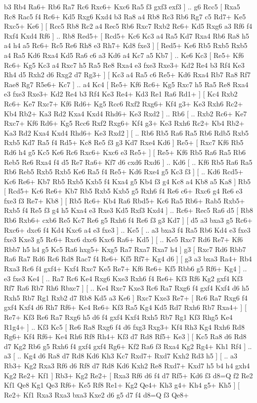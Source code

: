 b3 Rb4  Ra6+ Rb6  Ra7 Rc6  Rxc6+ Kxc6  Ra5 f3  gxf3 exf3   ] .. g6    Rcc5 [  Rxa5 Rc8  Rac5 f4  Rc6+ Kd5  Rxg6 Kxd4  b3 Ra8  a4 Rb8  Rc3 Rb6  Rg7 c5  Rd7+ Ke5  Rxc5+ Ke6   ]  [  Rcc5 Rb8  Rc2 a4  Rec5 Rb6  Rxc7 Rxb2  Rc6+ Kd5  Rxg6 a3  Rf6 f4  Rxf4 Kxd4  Rf6   ] .. Rb8    Red5+ [  Rcd5+ Kc6  Kc3 a4  Ra5 Kd7  Rxa4 Rb6  Ra8 h5  a4 h4  a5 Rc6+  Rc5 Re6  Rh8 e3  Rh7+ Kd8  fxe3   ]  [  Red5+ Ke6  Rb5 Rxb5  Rxb5 a4  Ra5 Kd6  Rxa4 Kd5  Ra6 c6  a3 Kd6  a4 Kc7  a5 Kb7   ] .. Ke6    Kc3 [  Re5+ Kf6  Rc6+ Kg5  Kc3 a4  Rxc7 h5  Ra5 Re8  Rxa4 e3  fxe3 Rxe3+  Kd2 Re4  b3 Rf4  Ke3 Rh4  d5 Rxh2  d6 Rxg2  d7 Rg3+   ]  [  Kc3 a4  Ra5 c6  Re5+ Kd6  Rxa4 Rb7  Ra8 Rf7  Rae8 Rg7  R5e6+ Kc7   ] .. a4    Kc4 [  Re5+ Kf6  Rc6+ Kg5  Rxc7 h5  Ra5 Re8  Rxa4 e3  fxe3 Rxe3+  Kd2 Re4  b3 Rf4  Ke3 Re4+  Kd3 Re1  Ra6 Rd1+   ]  [  Kc4 Rxb2  Rc6+ Ke7  Rxc7+ Kf6  Rd6+ Kg5  Rcc6 Rxf2  Rxg6+ Kf4  g3+ Ke3  Rxh6 Rc2+  Kb4 Rb2+  Ka3 Rd2  Kxa4 Kxd4  Rhd6+ Ke3  Rxd2   ] .. Rb6 [ .. Rxb2  Rc6+ Ke7  Rxc7+ Kf6  Rd6+ Kg5  Rcc6 Rxf2  Rxg6+ Kf4  g3+ Ke3  Rxh6 Rc2+  Kb4 Rb2+  Ka3 Rd2  Kxa4 Kxd4  Rhd6+ Ke3  Rxd2   ]  [ .. Rb6  Rb5 Ra6  Ra5 Rb6  Rdb5 Rxb5  Rxb5 Kd7  Ra5 f4  Rd5+ Kc8  Re5 f3  g3 Kd7  Rxe4 Kd6   ]  Re5+ [  Rxc7 Kf6  Rb5 Rd6  h4 g5  Kc5 Ke6  Rc6 Rxc6+  Kxc6 e3  Re5+   ]  [  Re5+ Kf6  Rb5 Ra6  Ra5 Rb6  Reb5 Re6  Rxa4 f4  d5 Re7  Ra6+ Kf7  d6 cxd6  Rxd6   ] .. Kd6 [ .. Kf6  Rb5 Ra6  Ra5 Rb6  Reb5 Rxb5  Rxb5 Ke6  Ra5 f4  Re5+ Kd6  Rxe4 g5  Kc3 f3   ]  [ .. Kd6  Rcd5+ Kc6  Re6+ Kb7  Rb5 Rxb5  Kxb5 f4  Kxa4 g5  Kb4 f3  g4 Kc8  a4 Kb8  a5 Ka8   ]  Rb5 [  Rcd5+ Kc6  Re6+ Kb7  Rb5 Rxb5  Kxb5 g5  Rxh6 f4  Re6 c6+  Rxc6 g4  Re6 e3  fxe3 f3  Re7+ Kb8   ]  [  Rb5 Rc6+  Kb4 Ra6  Rbd5+ Kc6  Ra5 Rb6+  Rab5 Rxb5+  Rxb5 f4  Re5 f3  g4 h5  Kxa4 e3  Rxe3 Kd5  Rxf3 Kxd4   ] .. Rc6+    Rec5   Ra6    d5 [  Rb8 Rb6  Rxb6+ cxb6  Re5 Kc7  Re6 g5  Rxh6 f4  Re6 f3  g3 Kd7   ]  [  d5 a3  bxa3 g5  Rc6+ Rxc6+  dxc6 f4  Kd4 Kxc6  a4 e3  fxe3   ] .. Ke5 [ .. a3  bxa3 f4  Ra5 Rb6  Kd4 e3  fxe3 fxe3  Kxe3 g5  Rc6+ Rxc6  dxc6 Kxc6  Ra6+ Kd5   ]  [ .. Ke5  Rxc7 Rd6  Re7+ Kf6  Rbb7 h5  h4 g5  Kc5 Ra6  hxg5+ Kxg5  Ra7 Rxa7  Rxa7 h4   ]  g3 [  Rxc7 Rd6  Rbb7 Ra6  Ra7 Rd6  Rc6 Rd8  Rac7 f4  Re6+ Kf5  Rf7+ Kg4  d6   ]  [  g3 a3  bxa3 Ra4+  Rb4 Rxa3  Rc6 f4  gxf4+ Kxf4  Rxc7 Ke5  Re7+ Kf6  Re6+ Kf5  Rbb6 g5  Rf6+ Kg4   ] .. e3    fxe3   Ke4 [ .. Ra7  Rc6 Ke4  Rxg6 Kxe3  Rxh6 f4  Re6+ Kf3  Rf6 Kg2  gxf4 Kf3  Rf7 Ra6  Rb7 Rh6  Rbxc7   ]  [ .. Ke4  Rxc7 Kxe3  Rc6 Ra7  Rxg6 f4  gxf4 Kxf4  d6 h5  Rxh5 Rb7  Rg1 Rxb2  d7 Rb8  Kd5 a3  Ke6   ]  Rxc7   Kxe3    Re7+ [  Rc6 Ra7  Rxg6 f4  gxf4 Kxf4  d6 Rh7  Rf6+ Ke4  Re6+ Kf3  Ra5 Kg4  Kd5 Rd7  Rxh6 Rb7  Rxa4+   ]  [  Re7+ Kf3  Re6 Ra7  Rxg6 h5  d6 f4  gxf4 Kxf4  Rxh5 Rb7  Rg1 Kf3  Rhg5 Ke4  R1g4+   ] .. Kf3    Kc5 [  Re6 Ra8  Rxg6 f4  d6 fxg3  Rxg3+ Kf4  Rh3 Kg4  Rxh6 Rd8  Rg6+ Kf4  Rf6+ Ke4  Rh6 Rf8  Rh4+ Kf3  d7 Rd8  Rf5+ Ke3   ]  [  Kc5 Ra8  d6 Rd8  d7 Kg2  Rb6 g5  Rxh6 f4  gxf4 gxf4  Rg6+ Kf2  Ra6 f3  Rxa4 Kg2  Rg4+ Kh1  Rf4   ] .. a3 [ .. Kg4  d6 Ra8  d7 Rd8  Kd6 Kh3  Kc7 Rxd7+  Rxd7 Kxh2  Rd3 h5   ]  [ .. a3  Rb3+ Kg2  Rxa3 Rf6  d6 Rf8  d7 Rd8  Kd6 Kxh2  Re8 Rxd7+  Kxd7 h5  b4 h4  gxh4 Kg2  Re2+ Kf1   ]  Rb3+   Kg2    Re2+ [  Rxa3 Rf6  d6 f4  d7 Rf5+  Kd6 f3  d8=Q f2  Re2 Kf1  Qe8 Kg1  Qe3 Rf6+  Ke5 Rf8  Re1+ Kg2  Qe4+ Kh3  g4+ Kh4  g5+ Kh5   ]  [  Re2+ Kf1  Rxa3 Rxa3  bxa3 Kxe2  d6 g5  d7 f4  d8=Q f3  Qe8+ 